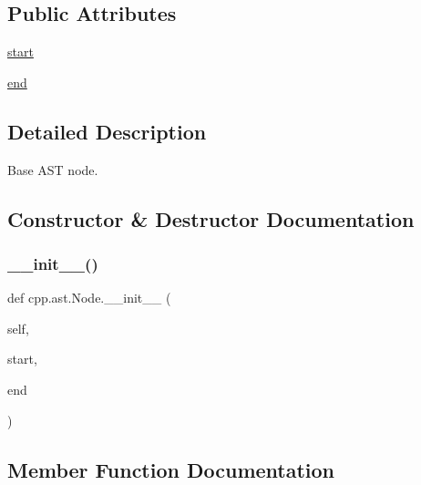 \subsection*{Public Attributes}
\begin{DoxyCompactItemize}
\item 
\mbox{\hyperlink{classcpp_1_1ast_1_1Node_a7b2aa97e6a049bb1a93aea48c48f1f44}{start}}
\item 
\mbox{\hyperlink{classcpp_1_1ast_1_1Node_a3c5e5246ccf619df28eca02e29d69647}{end}}
\end{DoxyCompactItemize}


\subsection{Detailed Description}
\begin{DoxyVerb}Base AST node.\end{DoxyVerb}
 

\subsection{Constructor \& Destructor Documentation}
\mbox{\label{classcpp_1_1ast_1_1Node_a2cbd6969346645259afc3be51faae904}} 
\subsubsection{\texorpdfstring{\_\_init\_\_()}{\_\_init\_\_()}}
{\footnotesize\ttfamily def cpp.\+ast.\+Node.\+\_\+\+\_\+init\+\_\+\+\_\+ (\begin{DoxyParamCaption}\item[{}]{self,  }\item[{}]{start,  }\item[{}]{end }\end{DoxyParamCaption})}



\subsection{Member Function Documentation}
\mbox{\label{classcpp_1_1ast_1_1Node_ab89915656a60c7b7c752e5baa607c532}} 
